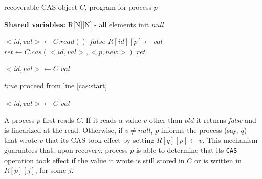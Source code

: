 \begin{algorithm}[b]%
	\caption{recoverable CAS object $C$, program for process $p$}
	\label{alg:recoverable-CAS}
	
	\hspace*{\algorithmicindent} \textbf{Shared variables:}
	R[N][N] - all elements init $null$

	\begin{multicols}{2}
	\begin{algorithmic}[1]
		\State ${<}id,val{>} \gets C.read()$ \label{cas:start}
		 \label{cas:if-compare-read}
		\State \Return $false$ \label{cas:return-false}
		\EndIf
  		\State $R[id][p] \gets val$ \label{cas:write-C-value}
		\EndIf
		\State $ret \gets C.cas({<}id,va{l}>, {<}p,new{>})$ \label{cas:primitive-apply}
		\State \Return $ret$ \label{cas:operation-return}
		\EndProcedure
		
		\State ${<}id,val{>} \gets C$ \label{cas:read-start}
		\State \Return $val$ \label{cas:read-return}
		\EndProcedure
		
		\columnbreak
		
		\State \Return $true$ \label{cas:recover-returns-true}
		\Else {}
		\State proceed from line \ref{cas:start} \label{cas:recover-re-execute}
		\EndIf
		\EndProcedure
		
		\State ${<}id,val{>} \gets C$ \label{cas:read-recover-start}
		\State \Return $val$ \label{cas:read-recover-return}
		\EndProcedure
	\end{algorithmic}
\end{multicols}
\end{algorithm}

A process $p$ first reads $C$. If it reads a value $v$ other than $old$ it returns \emph{false} and is linearized at the read. Otherwise, if $v \neq {null}$, $p$ informs the process (say, $q$) that wrote $v$ that its CAS took effect by setting $R[q][p] \gets v$.
This mechanism guarantees that, upon recovery, process $p$ is able to determine that its \texttt{CAS} operation took effect if the value it wrote is still stored in $C$ or is written in $R[p][j]$, for some $j$.


